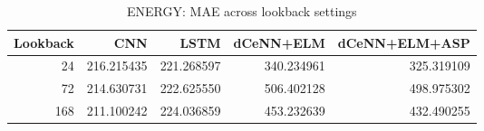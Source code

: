 \begin{table}
\caption{ENERGY: MAE across lookback settings}
\begin{tabular}{rrrrr}
\toprule
Lookback & CNN & LSTM & dCeNN+ELM & dCeNN+ELM+ASP \\
\midrule
24 & 216.215435 & 221.268597 & 340.234961 & 325.319109 \\
72 & 214.630731 & 222.625550 & 506.402128 & 498.975302 \\
168 & 211.100242 & 224.036859 & 453.232639 & 432.490255 \\
\bottomrule
\end{tabular}
\end{table}
